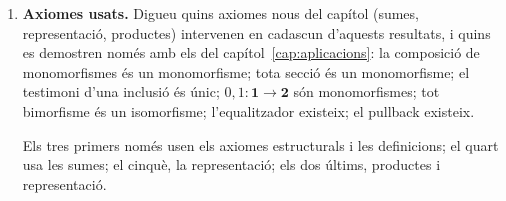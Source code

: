 \begin{enumerate}[resume]
  \item \textbf{Axiomes usats.} Digueu quins axiomes nous del capítol (sumes, representació, productes) intervenen en cadascun d'aquests resultats, i quins es demostren només amb els del capítol~\ref{cap:aplicacions}: la composició de monomorfismes és un monomorfisme; tota secció és un monomorfisme; el testimoni d'una inclusió és únic; \(0,1\colon\mathbf1\to\mathbf2\) són monomorfismes; tot bimorfisme és un isomorfisme; l'equalitzador existeix; el pullback existeix. \begin{indicacio}Els tres primers només usen els axiomes estructurals i les definicions; el quart usa les sumes; el cinquè, la representació; els dos últims, productes i representació.\end{indicacio}
\end{enumerate}
